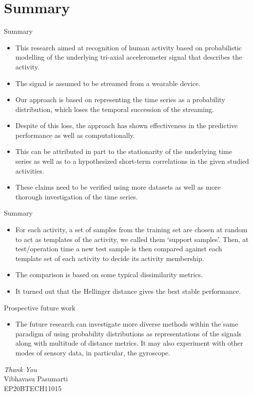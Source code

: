 \documentclass{beamer}
\begin{document}
\section{Summary}
\begin{frame}{Summary}
    \begin{itemize}
        \item This research aimed at recognition of human activity based on probabilistic modelling of the underlying tri-axial accelerometer signal that describes the activity. 
        \item The signal is assumed to be streamed from a wearable device. 
        \item Our approach is based on representing the time series as a probability distribution, which loses the temporal succession of the streaming.
        \item Despite of this loss, the approach has shown effectiveness in the predictive performance as well as computationally.
        \item This can be attributed in part to the stationarity of the underlying time series as well as to a hypothesized short-term correlations in the given studied activities.
        \item These claims need to be verified using more datasets as well as more thorough investigation of the time series.
    \end{itemize}
\end{frame}
\begin{frame}{Summary}
    \begin{itemize}
        \item For each activity, a set of samples from the training set are chosen at random to act as templates of the activity, we called them ‘support samples’. Then, at test/operation time a new test sample is then compared %
        against each template set of each activity to decide its activity membership.
        \item The comparison is based on some typical dissimilarity metrics.
        \item It turned out that the Hellinger distance gives the best stable performance.
    \end{itemize}
\end{frame}
\begin{frame}{Prospective future work}
    \begin{itemize}
        \item The future research can investigate more diverse methods within the same paradigm of using probability distributions as representations of the signals along with multitude of distance metrics. It may also experiment with other modes of sensory data, in particular, the gyroscope.
    \end{itemize}
\end{frame}
\begin{frame}
    \centering  \Huge
    \emph{ Thank You}\\
    \vspace{2cm}
    \large
    Vibhavasu Pasumarti\\
    EP20BTECH11015

\end{frame}
\end{document}
